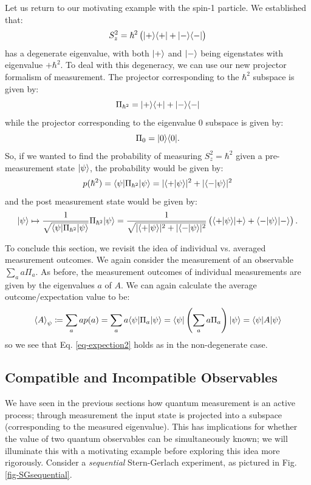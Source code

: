 Let us return to our motivating example with the spin-1 particle. We established that:
\begin{equation}
    S_z^2 = \hbar^2\left(\lvert + \rangle \langle + \rvert + \lvert - \rangle \langle - \rvert\right)
\end{equation}
has a degenerate eigenvalue, with both $\lvert + \rangle$ and $\lvert - \rangle$ being eigenstates with eigenvalue $+\hbar^2$. To deal with this degeneracy, we can use our new projector formalism of measurement. The projector corresponding to the $\hbar^2$ subspace is given by:
\begin{equation}
    \Pi_{\hbar^2} = \lvert + \rangle \langle + \rvert + \lvert - \rangle \langle - \rvert
\end{equation}
while the projector corresponding to the eigenvalue $0$ subspace is given by:
\begin{equation}
    \Pi_0 = \lvert 0 \rangle \langle 0 \rvert.
\end{equation}
So, if we wanted to find the probability of measuring $S_z^2 = \hbar^2$ given a pre-measurement state $\lvert \psi \rangle$, the probability would be given by:
\begin{equation}
    p(\hbar^2) = \langle \psi \rvert\Pi_{\hbar^2}\lvert \psi \rangle = \lvert \langle + \lvert \psi \rangle \rvert^2 + \lvert \langle - \lvert \psi \rangle \rvert^2
\end{equation}
and the post measurement state would be given by:
\begin{equation}
    \lvert \psi \rangle \mapsto \frac{1}{\sqrt{\langle \psi \rvert\Pi_{\hbar^2}\lvert \psi \rangle}}\Pi_{\hbar^2}\lvert \psi \rangle = \frac{1}{\sqrt{\lvert \langle + \lvert \psi \rangle \rvert^2 + \lvert \langle - \lvert \psi \rangle \rvert^2}}\left(\langle + \lvert \psi \rangle\lvert + \rangle + \langle - \lvert \psi \rangle\lvert - \rangle\right).
\end{equation}

To conclude this section, we revisit the idea of individual vs. averaged measurement outcomes. We again consider the measurement of an observable $\sum_a a \Pi_a$. As before, the measurement outcomes of individual measurements are given by the eigenvalues $a$ of $A$. We can again calculate the average outcome/expectation value to be:
\begin{equation}
    \left< A \right>_\psi \coloneqq \sum_a a p(a) = \sum_a a \langle \psi \rvert\Pi_a \lvert \psi \rangle = \langle \psi \rvert \left(\sum_a a \Pi_a \right) \lvert \psi \rangle = \langle \psi \rvert A\lvert \psi \rangle
\end{equation}
so we see that Eq. \eqref{eq-expection2} holds as in the non-degenerate case.

\subsection{Compatible and Incompatible Observables}
We have seen in the previous sections how quantum measurement is an active process; through measurement the input state is projected into a subspace (corresponding to the measured eigenvalue). This has implications for whether the value of two quantum observables can be simultaneously known; we will illuminate this with a motivating example before exploring this idea more rigorously. Consider a \emph{sequential} Stern-Gerlach experiment, as pictured in Fig. \ref{fig-SGsequential}.

